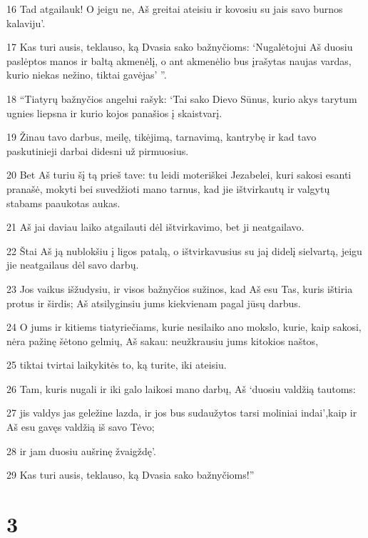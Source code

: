 \par 16 Tad atgailauk! O jeigu ne, Aš greitai ateisiu ir kovosiu su jais savo burnos kalaviju’. 
\par 17 Kas turi ausis, teklauso, ką Dvasia sako bažnyčioms: ‘Nugalėtojui Aš duosiu paslėptos manos ir baltą akmenėlį, o ant akmenėlio bus įrašytas naujas vardas, kurio niekas nežino, tiktai gavėjas’ ”. 
\par 18 “Tiatyrų bažnyčios angelui rašyk: ‘Tai sako Dievo Sūnus, kurio akys tarytum ugnies liepsna ir kurio kojos panašios į skaistvarį. 
\par 19 Žinau tavo darbus, meilę, tikėjimą, tarnavimą, kantrybę ir kad tavo paskutinieji darbai didesni už pirmuosius. 
\par 20 Bet Aš turiu šį tą prieš tave: tu leidi moteriškei Jezabelei, kuri sakosi esanti pranašė, mokyti bei suvedžioti mano tarnus, kad jie ištvirkautų ir valgytų stabams paaukotas aukas. 
\par 21 Aš jai daviau laiko atgailauti dėl ištvirkavimo, bet ji neatgailavo. 
\par 22 Štai Aš ją nublokšiu į ligos patalą, o ištvirkavusius su ja­į didelį sielvartą, jeigu jie neatgailaus dėl savo darbų. 
\par 23 Jos vaikus išžudysiu, ir visos bažnyčios sužinos, kad Aš esu Tas, kuris ištiria protus ir širdis; Aš atsilyginsiu jums kiekvienam pagal jūsų darbus. 
\par 24 O jums ir kitiems tiatyriečiams, kurie nesilaiko ano mokslo, kurie, kaip sakosi, nėra pažinę šėtono gelmių, Aš sakau: neužkrausiu jums kitokios naštos, 
\par 25 tiktai tvirtai laikykitės to, ką turite, iki ateisiu. 
\par 26 Tam, kuris nugali ir iki galo laikosi mano darbų, Aš ‘duosiu valdžią tautoms: 
\par 27 jis valdys jas geležine lazda, ir jos bus sudaužytos tarsi moliniai indai’,­kaip ir Aš esu gavęs valdžią iš savo Tėvo;­ 
\par 28 ir jam duosiu aušrinę žvaigždę’. 
\par 29 Kas turi ausis, teklauso, ką Dvasia sako bažnyčioms!”


\chapter{3}


